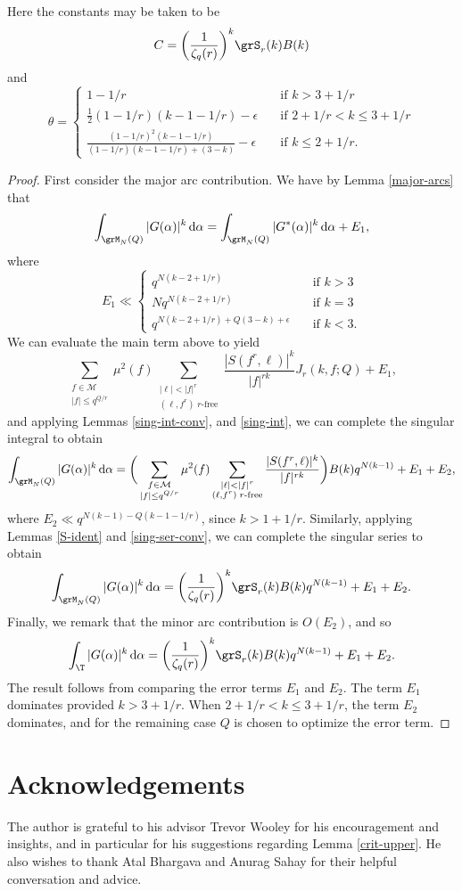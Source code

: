 \documentclass[reqno,11pt]{amsart}
\theoremstyle{definition}
\theoremstyle{remark}
\numberwithin{equation}{section}
\def\calM{{\mathcal M}}
\renewcommand{\d}{\,{\rm d}} %
\newcommand{\<}{\begin{equation}}
\renewcommand{\>}{\end{equation}}
\begin{document}
\asympt*
Here the constants may be taken to be
\[C = \bigg(\dfrac{1}{\zeta_q(r)}\bigg)^k \grS_r(k)B(k)\]
and
\[\theta = \begin{cases}
    1-1/r \quad &\text{if } k>3+1/r \\
    \frac{1}{2}(1-1/r)(k-1-1/r) - \epsilon \quad &\text{if } 2+1/r < k \leq 3+1/r \\
    \frac{(1-1/r)^2(k-1-1/r)}{(1-1/r)(k-1-1/r)+(3-k)} - \epsilon \quad &\text{if } k\leq 2+1/r.
\end{cases}\]
\begin{proof}
    First consider the major arc contribution. We have by Lemma \ref{major-arcs} that
    \[\int_{\grM_N(Q)} |G(\alpha)|^k \d\alpha = \int_{\grM_N(Q)} |G^*(\alpha)|^k \d\alpha + E_1,\]
    where
    \[E_1 \ll \begin{cases}
        q^{N(k-2+1/r)} \quad &\text{if } k>3 \\
        Nq^{N(k-2+1/r)} \quad &\text{if } k=3 \\
        q^{N(k-2+1/r) + Q(3-k)+\epsilon} \quad &\text{if } k < 3.
    \end{cases}\]
    We can evaluate the main term above to yield
    \[\sum_{\substack{f \in \calM \\ |f| \leq q^{Q/r}}}\mu^2(f)\sum_{\substack{|\ell|<|f|^r \\ (\ell,f^r) \; r\text{-free}}} \dfrac{|S(f^r,\ell)|^k}{|f|^{rk}}J_r(k,f;Q) + E_1,\]
    and applying Lemmas \ref{sing-int-conv}, and \ref{sing-int}, we can complete the singular integral to obtain
    \[\int_{\grM_N(Q)} |G(\alpha)|^k \d\alpha = \bigg(\sum_{\substack{f \in \calM \\ |f| \leq q^{Q/r}}}\mu^2(f)\sum_{\substack{|\ell|<|f|^r \\ (\ell,f^r) \; r\text{-free}}} \dfrac{|S(f^r,\ell)|^k}{|f|^{rk}}\bigg)B(k)q^{N(k-1)} + E_1 + E_2,\]
    where $E_2 \ll q^{N(k-1)-Q(k-1-1/r)}$, since $k>1+1/r$. Similarly, applying Lemmas \ref{S-ident} and \ref{sing-ser-conv}, we can complete the singular series to obtain
    \[\int_{\grM_N(Q)} |G(\alpha)|^k \d\alpha = \bigg(\dfrac{1}{\zeta_q(r)}\bigg)^k \grS_r(k)B(k)q^{N(k-1)} + E_1 + E_2.\]
    Finally, we remark that the minor arc contribution is $O(E_2)$, and so 
    \[\int_{\T} |G(\alpha)|^k \d\alpha = \bigg(\dfrac{1}{\zeta_q(r)}\bigg)^k \grS_r(k)B(k)q^{N(k-1)} + E_1 + E_2.\]
    The result follows from comparing the error terms $E_1$ and $E_2$. The term $E_1$ dominates provided $k>3+1/r$. When $2+1/r < k \leq 3+1/r$, the term $E_2$ dominates, and for the remaining case $Q$ is chosen to optimize the error term.
\end{proof}




\section*{Acknowledgements}

The author is grateful to his advisor Trevor Wooley for his encouragement and insights, and in particular for his suggestions regarding Lemma \ref{crit-upper}. He also wishes to thank Atal Bhargava and Anurag Sahay for their helpful conversation and advice.






\end{document}
